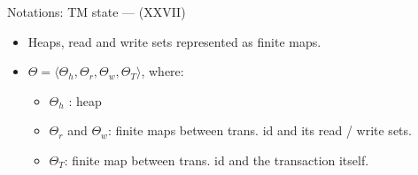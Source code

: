 \documentclass[14pt]{beamer}
\begin{document}
     \begin{frame}{Notations: TM state --- (XXVII)}
        \begin{itemize}
           \item Heaps, read and write sets represented as finite maps.
           \item $\Theta=\langle \Theta_h, \Theta_r, \Theta_w, \Theta_T \rangle$, where:
           \begin{itemize}
              \item $\Theta_h$ : heap
              \item $\Theta_r$ and $\Theta_w$: finite maps between trans. id and its read / write sets.
              \item $\Theta_T$: finite map between trans. id and the transaction itself.
           \end{itemize}
        \end{itemize}
     \end{frame}
\end{document}
